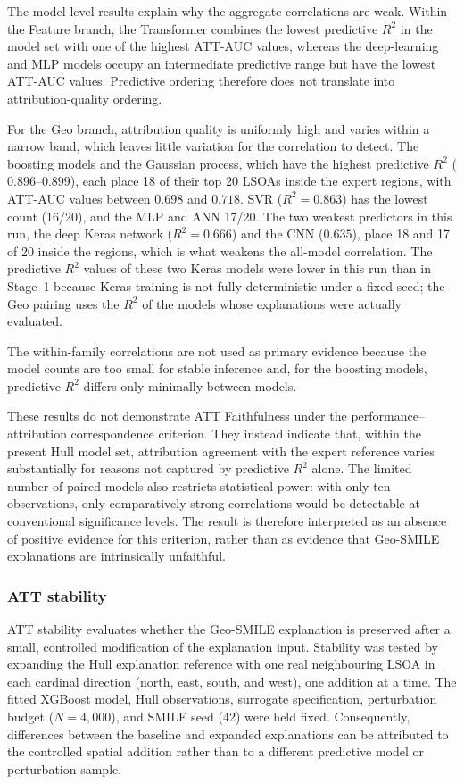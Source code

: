 The model-level results explain why the aggregate correlations are weak.
Within the Feature branch, the Transformer combines the lowest predictive
$R^2$ in the model set with one of the highest ATT-AUC values, whereas the
deep-learning and MLP models occupy an intermediate predictive range but have
the lowest ATT-AUC values. Predictive ordering therefore does not translate
into attribution-quality ordering.

For the Geo branch, attribution quality is uniformly high and varies within
a narrow band, which leaves little variation for the correlation to detect.
The boosting models and the Gaussian process, which have the highest predictive
$R^2$ ($0.896$--$0.899$), each place 18 of their top 20 LSOAs inside the
expert regions, with ATT-AUC values between $0.698$ and $0.718$. SVR
($R^2=0.863$) has the lowest count (16/20), and the MLP and ANN 17/20. The
two weakest predictors in this run, the deep Keras network ($R^2=0.666$) and
the CNN ($0.635$), place 18 and 17 of 20 inside the regions, which is what
weakens the all-model correlation. The predictive $R^2$ values of these two Keras models were lower in this
run than in Stage~1 because Keras training is not fully deterministic under a
fixed seed; the Geo pairing uses the $R^2$ of the models whose explanations
were actually evaluated.

The within-family correlations are not used as primary evidence because the
model counts are too small for stable inference and, for the boosting models,
predictive $R^2$ differs only minimally between models.

These results do not demonstrate ATT Faithfulness under the
performance--attribution correspondence criterion. They instead indicate that,
within the present Hull model set, attribution agreement with the expert
reference varies substantially for reasons not captured by predictive $R^2$
alone. The limited number of paired models also restricts statistical power:
with only ten observations, only comparatively strong correlations would be
detectable at conventional significance levels. The result is therefore
interpreted as an absence of positive evidence for this criterion, rather than
as evidence that Geo-SMILE explanations are intrinsically unfaithful.


\subsubsection{ATT stability}
\label{sec:hull_att_stability}

ATT stability evaluates whether the Geo-SMILE explanation is preserved after a
small, controlled modification of the explanation input. Stability was tested
by expanding the Hull explanation reference with one real neighbouring LSOA in
each cardinal direction (north, east, south, and west), one addition at a time.
The fitted XGBoost model, Hull observations, surrogate specification,
perturbation budget ($N=4{,}000$), and SMILE seed (42) were held fixed.
Consequently, differences between the baseline and expanded explanations can be
attributed to the controlled spatial addition rather than to a different
predictive model or perturbation sample.

